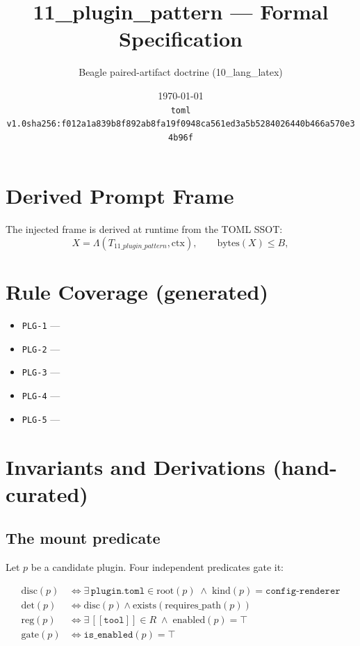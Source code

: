 \documentclass[11pt]{article}
\title{11\_plugin\_pattern --- Formal Specification}
\author{Beagle paired-artifact doctrine (10\_lang\_latex)}
\date{\today\\ \texttt{toml v1.0\quad sha256:f012a1a839b8f892ab8fa19f0948ca561ed3a5b5284026440b466a570e34b96f}}
\begin{document}
\maketitle

\section{Derived Prompt Frame}
The injected frame is derived at runtime from the TOML SSOT:
\begin{equation}
  X = \Lambda(T_{11\_plugin\_pattern}, \mathrm{ctx}), \qquad \mathrm{bytes}(X) \le B,
  \label{lbl:derive-frame}
\end{equation}

\section{Rule Coverage (generated)}
\begin{itemize}
  \item \texttt{PLG-1} ---  %
  \item \texttt{PLG-2} ---  %
  \item \texttt{PLG-3} ---  %
  \item \texttt{PLG-4} ---  %
  \item \texttt{PLG-5} ---  %
\end{itemize}

\section{Invariants and Derivations (hand-curated)}

\subsection{The mount predicate}

Let $p$ be a candidate plugin. Four independent predicates gate it:

\begin{align}
  \mathrm{disc}(p)  &\iff \exists\, \texttt{plugin.toml} \in \mathrm{root}(p)
                       \;\wedge\; \mathrm{kind}(p) = \texttt{config-renderer}
                       \label{lbl:disc}\\
  \mathrm{det}(p)   &\iff \mathrm{disc}(p) \wedge \mathrm{exists}\!\left(\mathrm{requires\_path}(p)\right)
                       \label{lbl:det}\\
  \mathrm{reg}(p)   &\iff \exists\, [[\texttt{tool}]] \in R \;\wedge\; \mathrm{enabled}(p) = \top
                       \label{lbl:reg}\\
  \mathrm{gate}(p)  &\iff \texttt{is\_enabled}(p) = \top
                       \label{lbl:gate}
\end{align}
\end{document}
